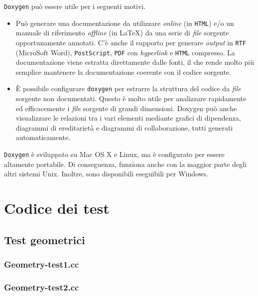 \texttt{Doxygen} può essere utile per i seguenti motivi.
\begin{itemize}
	\item Può generare una documentazione da utilizzare \textit{online} (in \texttt{HTML}) e/o un manuale di riferimento \textit{offline} (in \LaTeX) da una serie di \textit{file} sorgente opportunamente annotati. C'è anche il supporto per generare \textit{output} in \texttt{RTF} (MicroSoft Word), \texttt{PostScript}, \texttt{PDF} con \textit{hyperlink} e \texttt{HTML} compresso. La documentazione viene estratta direttamente dalle fonti, il che rende molto più semplice mantenere la documentazione coerente con il codice sorgente.
	\item È possibile configurare \texttt{doxygen} per estrarre la struttura del codice da \textit{file} sorgente non documentati. Questo è molto utile per analizzare rapidamente ed efficacemente i \textit{file} sorgente di grandi dimensioni. Doxygen può anche visualizzare le relazioni tra i vari elementi mediante grafici di dipendenza, diagrammi di ereditarietà e diagrammi di collaborazione, tutti generati automaticamente.
\end{itemize}
\texttt{Doxygen} è sviluppato su Mac OS X e Linux, ma è configurato per essere altamente portabile. Di conseguenza, funziona anche con la maggior parte degli altri sistemi Unix. Inoltre, sono disponibili eseguibili per Windows.



\chapter{Codice dei test}
\label{TestsCode}
%
\section{Test geometrici}
%
\subsection{Geometry-test1.cc}
\renewcommand{\baselinestretch}{1.0}

\renewcommand{\baselinestretch}{1.25}
%
\subsection{Geometry-test2.cc}
\renewcommand{\baselinestretch}{1.0}

\renewcommand{\baselinestretch}{1.25}
%
